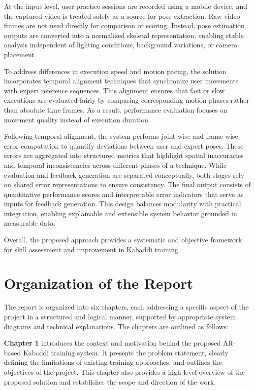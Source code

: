 \documentclass[12pt, a4paper]{report}
\begin{document}
At the input level, user practice sessions are recorded using a mobile device, and the captured video is treated solely as a source for pose extraction. Raw video frames are not used directly for comparison or scoring. Instead, pose estimation outputs are converted into a normalized skeletal representation, enabling stable analysis independent of lighting conditions, background variations, or camera placement.

To address differences in execution speed and motion pacing, the solution incorporates temporal alignment techniques that synchronize user movements with expert reference sequences. This alignment ensures that fast or slow executions are evaluated fairly by comparing corresponding motion phases rather than absolute time frames. As a result, performance evaluation focuses on movement quality instead of execution duration.

Following temporal alignment, the system performs joint-wise and frame-wise error computation to quantify deviations between user and expert poses. These errors are aggregated into structured metrics that highlight spatial inaccuracies and temporal inconsistencies across different phases of a technique. While evaluation and feedback generation are separated conceptually, both stages rely on shared error representations to ensure consistency. The final output consists of quantitative performance scores and interpretable error indicators that serve as inputs for feedback generation. This design balances modularity with practical integration, enabling explainable and extensible system behavior grounded in measurable data.

Overall, the proposed approach provides a systematic and objective framework for skill assessment and improvement in Kabaddi training.

\section{Organization of the Report}
The report is organized into six chapters, each addressing a specific aspect of the project in a structured and logical manner, supported by appropriate system diagrams and technical explanations. The chapters are outlined as follows:

\textbf{Chapter 1} introduces the context and motivation behind the proposed AR-based Kabaddi training system. It presents the problem statement, clearly defining the limitations of existing training approaches, and outlines the objectives of the project. This chapter also provides a high-level overview of the proposed solution and establishes the scope and direction of the work.
\end{document}
